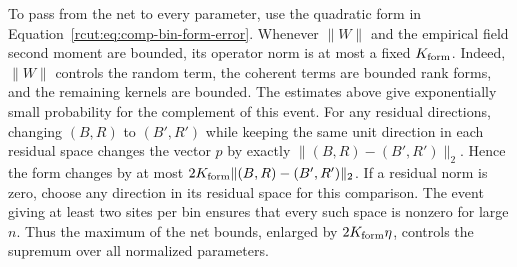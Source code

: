 To pass from the net to every parameter, use the quadratic form in
Equation~\eqref{rcut:eq:comp-bin-form-error}.  Whenever $\|W\|$ and the
empirical field second moment are bounded, its operator norm is at most
a fixed $K_{\rm form}$.  Indeed, $\|W\|$ controls the random term,
the coherent terms are bounded rank forms, and the remaining kernels
are bounded.  The estimates above give exponentially small probability
for the complement of this event.  For any residual directions, changing
$(B,R)$ to $(B',R')$ while keeping the same unit direction in each
residual space changes the vector $p$ by exactly
$\|(B,R)-(B',R')\|_2$.  Hence the form changes by at most
$2K_{\rm form}\|(B,R)-(B',R')\|_2$.
If a residual norm is zero, choose any direction in its residual
space for this comparison.  The event giving at least two sites per
bin ensures that every such space is nonzero for large $n$.  Thus
the maximum of the net bounds, enlarged by $2K_{\rm form}\eta$,
controls the supremum over all normalized parameters.

